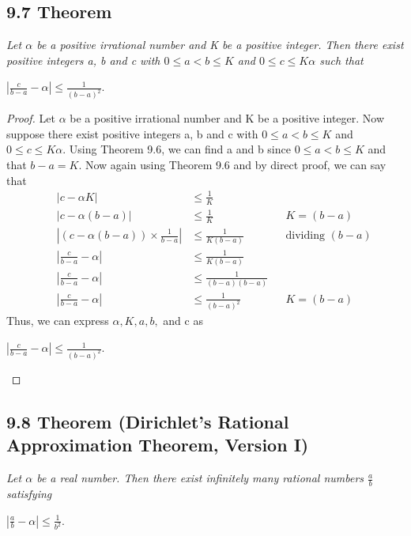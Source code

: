 \documentclass{article}
\begin{document}
\subsection*{9.7 Theorem} 
\quad \textit{Let $\alpha$ be a positive irrational number and K be a positive integer. Then there exist positive integers a, b and c with $0 \leq a < b \leq K$ and $0 \leq c \leq K\alpha$ such that}
\begin{center}
    $|\frac{c}{b-a}-\alpha| \leq \frac{1}{(b-a)^2}$.
\end{center}

\begin{proof}
Let $\alpha$ be a positive irrational number and K be a positive integer. Now suppose there exist positive integers a, b and c with $0 \leq a < b \leq K$ and $0 \leq c \leq K\alpha$. Using Theorem 9.6, we can find a and b since $0 \leq a < b \leq K$ and that $b-a = K$. Now again using Theorem 9.6 and by direct proof, we can say that 
\begin{align*}
    &&|c - \alpha K| &\leq \frac{1}{K} &&\\
    &&|c - \alpha(b-a)| &\leq \frac{1}{K} && K = (b - a) \\
    &&|(c - \alpha(b-a)) \times \frac{1}{b-a}| &\leq \frac{1}{K(b-a)} && \text{dividing $(b-a)$}\\
    &&|\frac{c}{b-a} - \alpha| &\leq \frac{1}{K(b-a)} &&\\
    &&|\frac{c}{b-a} - \alpha| &\leq \frac{1}{(b-a)(b-a)} &&\\
    &&|\frac{c}{b-a} - \alpha| &\leq \frac{1}{(b-a)^2} && K = (b-a)
\end{align*}
Thus, we can express $\alpha, K, a, b, $ and c as
\begin{center}
    $|\frac{c}{b-a}-\alpha| \leq \frac{1}{(b-a)^2}$.
\end{center}
\end{proof}

\subsection*{9.8 Theorem (Dirichlet's Rational Approximation Theorem, Version I)} 
\quad \textit{Let $\alpha$ be a real number. Then there exist infinitely many rational numbers $\frac{a}{b}$ satisfying}
\begin{center}
    $|\frac{a}{b}-\alpha| \leq \frac{1}{b^2}$.
\end{center}
\end{document}
